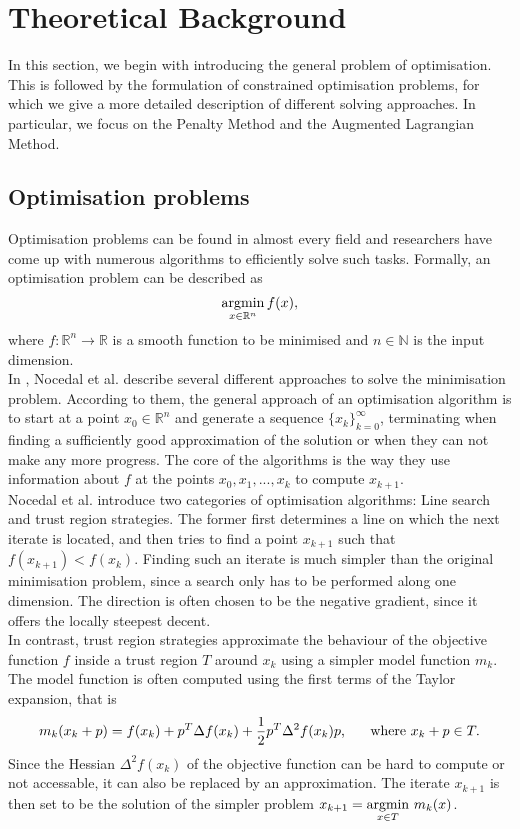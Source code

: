 \label{section:theoreticalBackground}
\section{Theoretical Background}
In this section, we begin with introducing the general problem of optimisation. This is followed by the formulation of constrained optimisation problems, for which we give a more detailed description of different solving approaches. In particular, we focus on the Penalty Method and the Augmented Lagrangian Method.
\subsection{Optimisation problems}
Optimisation problems can be found in almost every field and researchers have come up with numerous algorithms to efficiently solve such tasks. Formally, an optimisation problem can be described as 
\[\operatorname*{argmin}_{x \in \mathbb{R}^n} f(x),\]
where $f\colon \mathbb{R}^n\to \mathbb{R}$ is a smooth function to be minimised and $n \in \mathbb{N}$ is the input dimension.\\
In \cite{NoceWrig06}, Nocedal et al. describe several different approaches to solve the minimisation problem. According to them, the general approach of an optimisation algorithm is to start at a point $x_0 \in \mathbb{R}^n$ and generate a sequence $\{x_k\}_{k=0}^\infty$, terminating when finding a sufficiently good approximation of the solution or when they can not make any more progress. The core of the algorithms is the way they use information about $f$ at the points $x_0, x_1, ..., x_k$ to compute $x_{k+1}$. \\
\indent Nocedal et al. introduce two categories of optimisation algorithms: Line search and trust region strategies. The former first determines a line on which the next iterate is located, and then tries to find a point $x_{k+1}$ such that $f(x_{k+1}) < f(x_k)$. Finding such an iterate is much simpler than the original minimisation problem, since a search only has to be performed along one dimension. The direction is often chosen to be the negative gradient, since it offers the locally steepest decent. 
\\ \indent In contrast, trust region strategies approximate the behaviour of the objective function $f$ inside a trust region $T$ around $x_k$ using a simpler model function $m_k$. The model function is often computed using the first terms of the Taylor expansion, that is \[m_k(x_k + p) = f(x_k) + p^T\Delta f(x_k) + \frac{1}{2}p^T\Delta^2 f(x_k) p \text{, \indent where } x_k + p \in T.\] Since the Hessian $\Delta^2 f(x_k)$ of the objective function can be hard to compute or not accessable, it can also be replaced by an approximation. The iterate $x_{k+1}$ is then set to be the solution of the simpler problem $x_{k+1} = \underset{x \in T}{\operatorname*{argmin} }  \,\,m_k(x)$.

